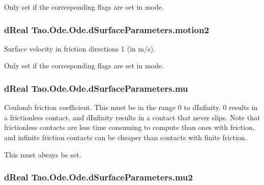 Only set if the corresponding flags are set in mode. \hypertarget{struct_tao_1_1_ode_1_1_ode_1_1d_surface_parameters_a04243c207c92edb82d524c91422f2baf}{
\subsubsection[{motion2}]{\setlength{\rightskip}{0pt plus 5cm}dReal {\bf Tao.Ode.Ode.dSurfaceParameters.motion2}}}
\label{struct_tao_1_1_ode_1_1_ode_1_1d_surface_parameters_a04243c207c92edb82d524c91422f2baf}


Surface velocity in friction directions 1 (in m/s). 

Only set if the corresponding flags are set in mode. \hypertarget{struct_tao_1_1_ode_1_1_ode_1_1d_surface_parameters_a2a60d95da0f8ca8b32f22febdd2319b3}{
\subsubsection[{mu}]{\setlength{\rightskip}{0pt plus 5cm}dReal {\bf Tao.Ode.Ode.dSurfaceParameters.mu}}}
\label{struct_tao_1_1_ode_1_1_ode_1_1d_surface_parameters_a2a60d95da0f8ca8b32f22febdd2319b3}


Coulomb friction coefficient. This must be in the range 0 to dInfinity. 0 results in a frictionless contact, and dInfinity results in a contact that never slips. Note that frictionless contacts are less time consuming to compute than ones with friction, and infinite friction contacts can be cheaper than contacts with finite friction. 

This must always be set. \hypertarget{struct_tao_1_1_ode_1_1_ode_1_1d_surface_parameters_a36843e30f735975c949e7c9705f97e3f}{
\subsubsection[{mu2}]{\setlength{\rightskip}{0pt plus 5cm}dReal {\bf Tao.Ode.Ode.dSurfaceParameters.mu2}}}
\label{struct_tao_1_1_ode_1_1_ode_1_1d_surface_parameters_a36843e30f735975c949e7c9705f97e3f}



